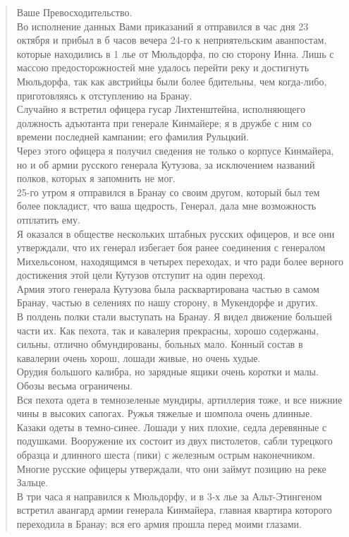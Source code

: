 \documentclass[
  oneside,
  12pt,
  titlepage]{book}
\begin{document}
\begin{quote}
Ваше Превосходительство.\\
Во исполнение данных Вами приказаний я отправился в час дня 23 октября и прибыл в б часов вечера 24-го к неприятельским аванпостам, которые находились в 1 лье от Мюльдорфа, по сю сторону Инна. Лишь с массою предосторожностей мне удалось перейти реку и достигнуть Мюльдорфа, так как австрийцы были более бдительны, чем когда-либо, приготовляясь к отступлению на Бранау.\\
Случайно я встретил офицера гусар Лихтенштейна, исполняющего должность адъютанта при генерале Кинмайере; я в дружбе с ним со времени последней кампании; его фамилия Рульцкий.\\
Через этого офицера я получил сведения не только о корпусе Кинмайера, но и об армии русского генерала Кутузова, за исключением названий полков, которых я запомнить не мог.\\
25-го утром я отправился в Бранау со своим другом, который был тем более покладист, что ваша щедрость, Генерал, дала мне возможность отплатить ему.\\
Я оказался в обществе нескольких штабных русских офицеров, и все они утверждали, что их генерал избегает боя ранее соединения с генералом Михельсоном, находящимся в четырех переходах, и что ради более верного достижения этой цели Кутузов отступит на один переход.\\
Армия этого генерала Кутузова была расквартирована частью в самом Бранау, частью в селениях по нашу сторону, в Мукендорфе и других.\\
В полдень полки стали выступать на Бранау. Я видел движение большей части их. Как пехота, так и кавалерия прекрасны, хорошо содержаны, сильны, отлично обмундированы, больных мало. Конный состав в кавалерии очень хорош, лошади живые, но очень худые.\\
Орудия большого калибра, но зарядные ящики очень коротки и малы. Обозы весьма ограничены.\\
Вся пехота одета в темнозеленые мундиры, артиллерия тоже, и все нижние чины в высоких сапогах. Ружья тяжелые и шомпола очень длинные.\\
Казаки одеты в темно-синее. Лошади у них плохие, седла деревянные с подушками. Вооружение их состоит из двух пистолетов, сабли турецкого образца и длинного шеста (пики) с железным острым наконечником.\\
Многие русские офицеры утверждали, что они займут позицию на реке Зальце.\\
В три часа я направился к Мюльдорфу, и в 3-х лье за Альт-Этингеном встретил авангард армии генерала Кинмайера, главная квартира которого переходила в Бранау; вся его армия прошла перед моими глазами.\\

\end{quote}
\end{document}
